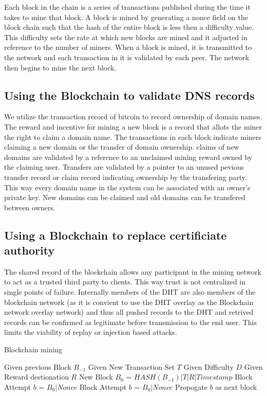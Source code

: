 \documentclass[11pt]{IEEEtran} %
\begin{document}
Each block in the chain is a series of transactions published during the time it takes to mine that block. A block is mined by generating a nonce field on the block chain such that the hash of the entire block is less then a difficulty value. This difficulty sets the rate at which new blocks are mined and it adjusted in reference to the number of miners. When a block is mined, it is transmitted to the network and each transaction in it is validated by each peer. The network then begins to mine the next block.


\subsection{Using the Blockchain to validate DNS records}
We utilize the transaction record of bitcoin to record ownership of domain names. The reward and incentive for mining a new block is a record that allots the miner the right to claim a domain name. The transactions in each block indicate miners claiming a new domain or the transfer of domain ownership. claims of new domains are validated by a reference to an unclaimed mining reward owned by the claiming user. Transfers are validated by a pointer to an unused pevious transfer record or claim record indicating ownership by the transfering party. This way every domain name in the system can be associated with an owner's private key. New domains can be claimed and old domains can be transfered between owners.

\subsection{Using a Blockchain to replace certificiate authority}
The shared record of the blockchain allows any participant in the mining network to act as a trusted third party to clients. This way trust is not centralized in single points of failure. Internally members of the DHT are also members of the blockchain network (as it is convient to use the DHT overlay as the Blockchain network overlay network) and thus all pushed records to the DHT and retrived records can be confirmed as legitimate before transmission to the end user. This limits the viability of replay or injection based attacks.


\begin{algorithm}
\caption{Blockchain mining}
\label{mining}
\begin{algorithmic}[1]  %
\STATE Given previous Block $B_{-1}$
\STATE Given New Transaction Set $T$
\STATE Given Difficulty $D$
\STATE Given Reward destionation $R$
\STATE New Block $B_0$ = $HASH(B_{-1})|T|R|Timestamp$
\STATE Block Attempt $b$ = $B_0|Nonce$
	\STATE Block Attempt $b$ = $B_0|Nonce$
\ENDWHILE
\STATE Propogate $b$ as next block
\end{algorithmic}
\end{algorithm}
\end{document}
